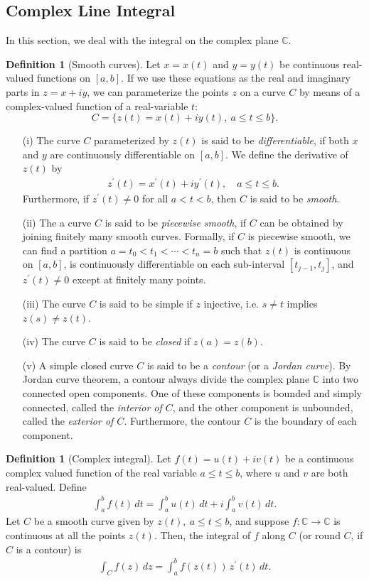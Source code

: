 \documentclass{article}
\numberwithin{equation}{section}
\newcommand{\bbC}{\mathbb{C}}
\theoremstyle{plain}
\theoremstyle{definition}
\newtheorem{definition}[theorem]{Definition}
\begin{document}
\subsection{Complex Line Integral}
In this section, we deal with the integral on the complex plane $\bbC$.
\begin{definition}[Smooth curves]
Let $x=x(t)$ and $y=y(t)$ be continuous real-valued functions on $[a,b]$. If we use these equations as the real and imaginary parts in $z=x+iy$, we can parameterize the points $z$ on a curve $C$ by means of a complex-valued function of a real-variable $t$: 
$$C=\{z(t)=x(t)+iy(t),\ a\leq t\leq b\}.$$ 
\begin{itemize}
\item[(i)] The curve $C$ parameterized by $z(t)$ is said to be \textit{differentiable}, if both $x$ and $y$ are continuously differentiable on $[a,b]$. We define the derivative of $z(t)$ by
\begin{align*}
	z^\prime(t)=x^\prime(t)+iy^\prime(t),\quad a\leq t\leq b.
\end{align*}
Furthermore, if $z^\prime(t)\neq 0$ for all $a<t<b$, then $C$ is said to be \textit{smooth}.
\item[(ii)] The a curve $C$ is said to be \textit{piecewise smooth}, if $C$ can be obtained by joining finitely many smooth curves. Formally, if $C$ is piecewise smooth, we can find a partition $a=t_0<t_1<\cdots<t_n=b$ such that $z(t)$ is continuous on $[a,b]$, is continuously differentiable on each sub-interval $[t_{j-1},t_j]$, and $z^\prime(t)\neq 0$ except at finitely many points.
\item[(iii)] The curve $C$ is said to be simple if $z$ injective, i.e. $s\neq t$ implies $z(s)\neq z(t)$.
\item[(iv)] The curve $C$ is said to be \textit{closed} if $z(a)=z(b)$.
\item[(v)] A simple closed curve $C$ is said to be a \textit{contour} (or a \textit{Jordan curve}). By Jordan curve theorem, a contour always divide the complex plane $\bbC$ into two connected open components. One of these components is bounded and simply connected, called the \textit{interior of $C$}, and the other component is unbounded, called the \textit{exterior of $C$}. Furthermore, the contour $C$ is the boundary of each component.
\end{itemize}
\end{definition}

\begin{definition}[Complex integral]
Let $f(t)=u(t)+iv(t)$ be a continuous complex valued function of the real variable $a\leq t\leq b$, where $u$ and $v$ are both real-valued. Define
\begin{align*}
	\int_a^b f(t)\,dt=\int_a^b u(t)\,dt+i\int_a^b v(t)\,dt.
\end{align*}
Let $C$ be a smooth curve given by $z(t),\ a\leq t\leq b$, and suppose $f:\bbC\to\bbC$ is continuous at all the points $z(t)$. Then, the integral of $f$ along $C$ (or round $C$, if $C$ is a contour) is
\begin{align*}
	\int_C f(z)\,dz=\int_a^b f(z(t))\,z^\prime(t)\,dt.
\end{align*}
\end{definition}
\end{document}
